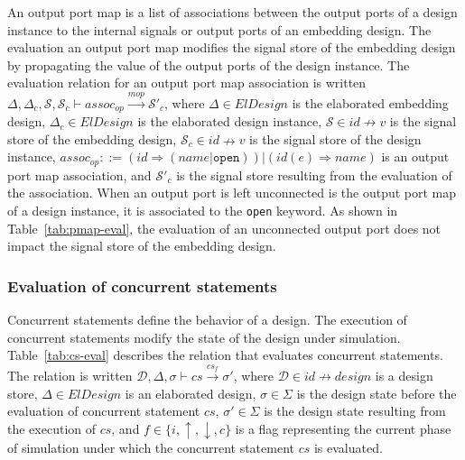 \documentclass[pdflatex,sn-mathphys]{sn-jnl}%
\theoremstyle{thmstyleone}%
\theoremstyle{thmstyletwo}%
\theoremstyle{thmstylethree}%
\begin{document}
An output port map is a list of associations between the output ports
of a design instance to the internal signals or output ports of an
embedding design.  The evaluation an output port map modifies the
signal store of the embedding design by propagating the value of the
output ports of the design instance. The evaluation relation for an
output port map association is written
$\Delta,\Delta_c,\mathcal{S},\mathcal{S}_c\vdash{}assoc_{op}\xrightarrow{mop}\mathcal{S}'_c$,
where $\Delta\in{}ElDesign$ is the elaborated embedding design,
$\Delta_c\in{}ElDesign$ is the elaborated design instance,
$\mathcal{S}\in{}id\nrightarrow{}v$ is the signal store of the
embedding design, $\mathcal{S}_c\in{}id\nrightarrow{}v$ is the signal
store of the design instance,
$assoc_{op}::=(id\Rightarrow{}(name|\mathtt{open}))\big|(id(e)\Rightarrow{}name)$
is an output port map association, and $\mathcal{S}'_c$ is the signal
store resulting from the evaluation of the association. When an output
port is left unconnected is the output port map of a design instance,
it is associated to the \texttt{open} keyword. As shown in
Table~\ref{tab:pmap-eval}, the evaluation of an unconnected output
port does not impact the signal store of the embedding design.

\subsubsection{Evaluation of concurrent statements}
\label{subsubsec:cs-eval}

Concurrent statements define the behavior of a \hvhdl{} design. The
execution of concurrent statements modify the state of the \hvhdl{}
design under simulation. Table~\ref{tab:cs-eval} describes the
relation that evaluates concurrent statements. The relation is written
$\mathcal{D},\Delta,\sigma\vdash{}cs\xrightarrow{cs_f}\sigma'$, where
$\mathcal{D}\in{}id\nrightarrow{}design$ is a design store,
$\Delta\in{}ElDesign$ is an elaborated design, $\sigma\in\Sigma$ is
the design state before the evaluation of concurrent statement $cs$,
$\sigma'\in\Sigma$ is the design state resulting from the execution of
$cs$, and $f\in\{i,\uparrow,\downarrow,c\}$ is a flag representing the
current phase of simulation under which the concurrent statement $cs$
is evaluated.
\end{document}
